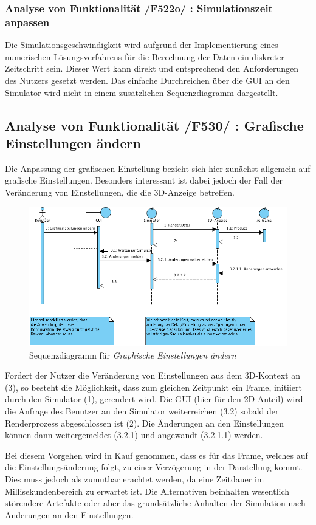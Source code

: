 \subsubsection{Analyse von Funktionalität /F522o/ :  Simulationszeit anpassen}
Die Simulationsgeschwindigkeit wird aufgrund der Implementierung eines numerischen Lösungsverfahrens für die Berechnung der Daten ein diskreter Zeitschritt sein. Dieser Wert kann direkt und entsprechend
den Anforderungen des Nutzers gesetzt werden. Das einfache Durchreichen über die GUI an den Simulator wird nicht in einem zusätzlichen Sequenzdiagramm dargestellt.
\subsection{Analyse von Funktionalität /F530/ :  Grafische Einstellungen ändern}
Die Anpassung der grafischen Einstellung bezieht sich hier zunächst allgemein auf grafische Einstellungen. Besonders interessant ist dabei jedoch der Fall der Veränderung von Einstellungen, die 
die 3D-Anzeige betreffen. 

\begin{figure}[h!]
\includegraphics[width=\linewidth]{bilder/change_graphic_config}
\caption{Sequenzdiagramm für \textit{Graphische Einstellungen ändern}}
\end{figure}
Fordert der Nutzer die Veränderung von Einstellungen aus dem 3D-Kontext an (3), so besteht die Möglichkeit, dass zum gleichen Zeitpunkt ein Frame, initiiert durch den Simulator (1), gerendert wird. 
Die GUI (hier für den 2D-Anteil) wird die Anfrage des Benutzer an den Simulator weiterreichen (3.2) sobald der Renderprozess abgeschlossen ist (2). Die Änderungen an den Einstellungen können dann weitergemeldet (3.2.1) und angewandt (3.2.1.1) werden.

Bei diesem Vorgehen wird in Kauf genommen, dass es für das Frame, welches auf die Einstellungsänderung folgt, zu einer Verzögerung in der Darstellung kommt. Dies muss jedoch als zumutbar erachtet werden, da eine Zeitdauer im Millisekundenbereich zu erwartet ist. Die Alternativen beinhalten wesentlich störendere Artefakte oder aber das grundsätzliche Anhalten der Simulation nach Änderungen an den Einstellungen.

